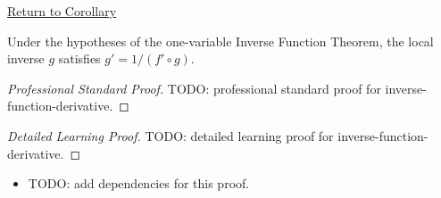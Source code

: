 \newpage
{}
\label{prf:inverse-function-derivative}

\begin{remark*}[Return]
\hyperref[cor:inverse-function-derivative]{Return to Corollary}
\end{remark*}

\begin{corollary*}
Under the hypotheses of the one-variable Inverse Function Theorem, the local inverse \(g\) satisfies \(g'=1/(f'\circ g)\).
\end{corollary*}

\begin{proof}[Professional Standard Proof]
\LRAProofBodyStart
TODO: professional standard proof for inverse-function-derivative.
\end{proof}

\begin{proof}[Detailed Learning Proof]
\LRAProofBodyStart
TODO: detailed learning proof for inverse-function-derivative.
\end{proof}

\begin{remark*}
\end{remark*}

\begin{dependencies}
\begin{itemize}
  \item TODO: add dependencies for this proof.
\end{itemize}
\end{dependencies}

\clearpage
